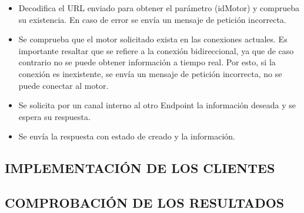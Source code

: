     \begin{itemize}
        \item Decodifica el URL enviado para obtener el parámetro (idMotor) y
            comprueba su existencia. En caso de error se envía un mensaje
            de petición incorrecta.
        \item Se comprueba que el motor solicitado exista en las conexiones
            actuales. Es importante resaltar que se refiere a la conexión
            bidireccional, ya que de caso contrario no se puede obtener información
            a tiempo real. Por esto, si la conexión es inexistente, se envía un
            mensaje de petición incorrecta, no se puede conectar al motor.
        \item Se solicita por un canal interno al otro Endpoint la información
            deseada y se espera su respuesta.
        \item Se envía la respuesta con estado de creado y la información.
    \end{itemize}


\subsection{IMPLEMENTACIÓN DE LOS CLIENTES}

\subsection{COMPROBACIÓN DE LOS RESULTADOS}

